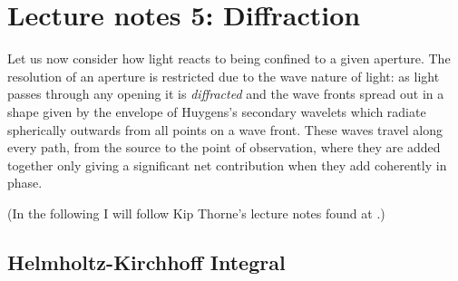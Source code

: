 %
\section{Lecture notes 5: Diffraction}

Let us now consider how light reacts to being confined to a given aperture. The resolution 
of an aperture is restricted due to the wave nature of light: as light passes through any 
opening it is {\it diffracted} and the wave fronts spread out in a shape given by the 
envelope of Huygens's secondary wavelets which radiate spherically outwards from all points on 
a wave front. These waves travel along every path, from the source to the point of observation,
where they are added together only giving a significant net contribution when they add 
coherently in phase. 

\noindent (In the following I will follow Kip Thorne's lecture notes found at 
.)

\subsection*{Helmholtz-Kirchhoff Integral}

